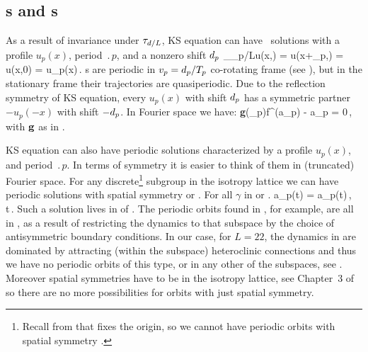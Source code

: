 \subsection{\Rpo s and \po s} \label{sec:KSePO}

As a result of invariance under $\tau_{d/L}$,
KS equation can have \rpo\ solutions
with a profile $u_p(x)$, period $\period{p}$, and a
nonzero shift $d_p$
\beq
  \Shift_{\shift_p/L}u(x,) =
  u(x+\shift_p,) = u(x,0) = u_p(x)\,.
\label{KSrpos}
\eeq
{\Rpo s}  are periodic in
$v_p=d_p/{T_{p}}$ co-rotating frame (see
), but in the stationary frame their
trajectories are quasiperiodic.  Due to the reflection symmetry
 of KS equation, every {\rpo} $u_p(x)$ with shift
$d_p$ has a symmetric partner $-u_p(-x)$ with shift $-d_p$.
In Fourier space we have:
\beq
  {\bf g}(\shift_p)f^(a_p) - a_p = 0\,,
with ${\bf g}$ as in .


KS equation can also have periodic solutions
characterized by a profile $u_p(x)$,
and period $\period{p}$. In terms of symmetry it is easier to think of them
in (truncated) Fourier space. For any discrete\footnote{Recall from that  fixes the origin, so
we cannot have periodic orbits with spatial symmetry .} subgroup in the isotropy lattice
we can have periodic solutions with spatial symmetry  or . For all $\gamma$ in  or .
\beq
  \gamma a_p(t) = a_p(t)\,, \qquad  \forall t\in[0,\period{p}]\,.
\eeq
Such a solution lives in  of .
The periodic orbits found in , for example,
are all in , as a result of restricting the dynamics to that subspace by the choice of antisymmetric
boundary conditions. In our case, for $L=22$, the dynamics in  are dominated by attracting (within
the subspace) heteroclinic connections and thus we have no periodic orbits of this type, or in
any other of the  subspaces, see . Moreover spatial symmetries have to
be in the isotropy lattice, see Chapter~3 of  so there are no more possibilities
for orbits with just spatial symmetry.

